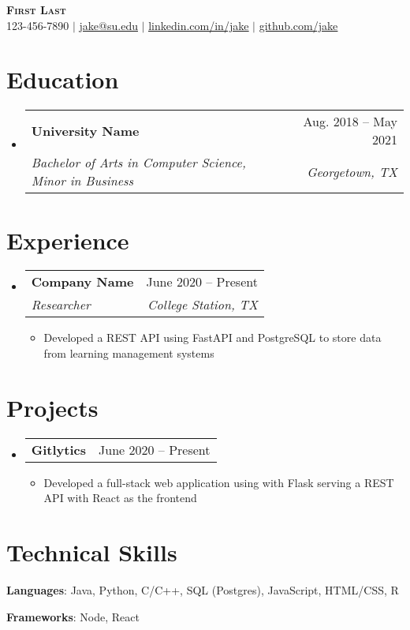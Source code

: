 \documentclass[letterpaper,12pt]{extarticle}
\makeatletter
\newcommand{\resumeItem}[1]{
    \item\small{
            {#1 \vspace{-2pt}}
    }
}
\newcommand{\resumeSubheading}[4]{
    \vspace{-1pt}\item
    \begin{tabular*}{0.97\textwidth}[t]{l@{\extracolsep{\fill}}r}
    \textbf{#1} & \footnotesize #2 \\
    \textit{\small #3} & \textit{\footnotesize #4} \\
    \end{tabular*}\vspace{-7pt}
}
\newcommand{\resumeProjectHeading}[2]{
    \item
    \begin{tabular*}{0.97\textwidth}{l@{\extracolsep{\fill}}r}
    \textbf{#1} & \small #2 \\
    \end{tabular*}\vspace{-7pt}
}
\newcommand{\resumeSubHeadingListStart}{\begin{itemize}[leftmargin=0.15in, label={}]}
\newcommand{\resumeSubHeadingListEnd}{\end{itemize}}
\newcommand{\resumeItemListStart}{
\begin{itemize}
\itemsep 2pt
}
\newcommand{\resumeItemListEnd}{\end{itemize}\vspace{-5pt}}
\makeatother
\begin{document}
\begin{center}
\textbf{\Huge \scshape First Last} \\ \vspace{1pt}
\small 123-456-7890 $|$ \href{mailto:x@x.com}{\underline{jake@su.edu}} $|$
\href{https://linkedin.com/in/...}{\underline{linkedin.com/in/jake}} $|$
\href{https://github.com/...}{\underline{github.com/jake}}
\end{center}


\section{Education}
\resumeSubHeadingListStart
\resumeSubheading
{University Name}{Aug. 2018 -- May 2021}
{Bachelor of Arts in Computer Science, Minor in Business}{Georgetown, TX}
\resumeSubHeadingListEnd

\section{Experience}
\resumeSubHeadingListStart
\resumeSubheading
{Company Name}{June 2020 -- Present}
{Researcher}{College Station, TX}
\resumeItemListStart
\resumeItem{Developed a REST API using FastAPI and PostgreSQL to store data from learning management systems}
\resumeItemListEnd
\resumeSubHeadingListEnd


\section{Projects}
\resumeSubHeadingListStart
\resumeProjectHeading
{\textbf{Gitlytics}}{June 2020 -- Present}
\resumeItemListStart
\resumeItem{Developed a full-stack web application using with Flask serving a REST API with React as the frontend}
\resumeItemListEnd
\resumeSubHeadingListEnd



\section{Technical Skills}
\begin{itemize}[leftmargin=0.15in, label={}]
\itemsep -2pt
\small{\item{
\textbf{Languages}{: Java, Python, C/C++, SQL (Postgres), JavaScript, HTML/CSS, R} \\
}}
\small{\item{
\textbf{Frameworks}{: Node, React} \\
}}
\end{itemize}

\end{document}
